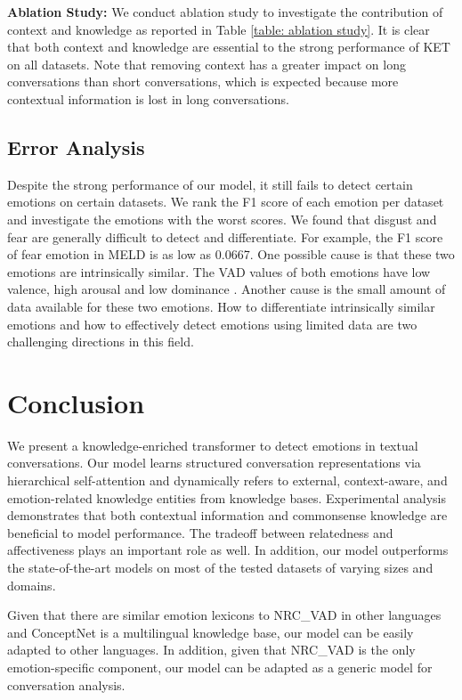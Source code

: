 \documentclass[11pt,a4paper]{article}
\begin{document}
\noindent\textbf{Ablation Study:}
We conduct ablation study to investigate the contribution of context and knowledge as reported in Table \ref{table: ablation study}. It is clear that both context and knowledge are essential to the strong performance of KET on all datasets. Note that removing context has a greater impact on long conversations than short conversations, which is expected because more contextual information is lost in long conversations.


\subsection{Error Analysis}
\label{sec: error analysis}
Despite the strong performance of our model, it still fails to detect certain emotions on certain datasets. We rank the F1 score of each emotion per dataset and investigate the emotions with the worst scores. We found that disgust and fear are generally difficult to detect and differentiate. For example, the F1 score of fear emotion in MELD is as low as 0.0667. One possible cause is that these two emotions are intrinsically similar. The VAD values of both emotions have low valence, high arousal and low dominance \cite{mehrabian1996pleasure}. Another cause is the small amount of data available for these two emotions. How to differentiate intrinsically similar emotions and how to effectively detect emotions using limited data are two challenging directions in this field.

\section{Conclusion}
\label{conclusions}
We present a knowledge-enriched transformer to detect emotions in textual conversations. 
Our model learns structured conversation representations via hierarchical self-attention and dynamically refers to external, context-aware, and emotion-related knowledge entities from knowledge bases. Experimental analysis demonstrates that both contextual information and commonsense knowledge are beneficial to model performance. The tradeoff between relatedness and affectiveness plays an important role as well. In addition, our model outperforms the state-of-the-art models on most of the tested datasets of varying sizes and domains. 

Given that there are similar emotion lexicons to NRC\_VAD in other languages and ConceptNet is a multilingual knowledge base, our model can be easily adapted to other languages. In addition, given that NRC\_VAD is the only emotion-specific component, our model can be adapted as a generic model for conversation analysis.
\end{document}
